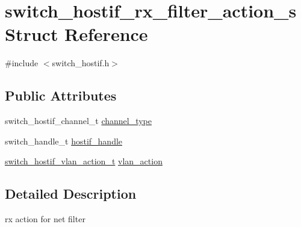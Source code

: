 \hypertarget{structswitch__hostif__rx__filter__action__s}{\section{switch\+\_\+hostif\+\_\+rx\+\_\+filter\+\_\+action\+\_\+s Struct Reference}
\label{structswitch__hostif__rx__filter__action__s}
}


{\ttfamily \#include $<$switch\+\_\+hostif.\+h$>$}

\subsection*{Public Attributes}
\begin{DoxyCompactItemize}
\item 
switch\+\_\+hostif\+\_\+channel\+\_\+t \hyperlink{structswitch__hostif__rx__filter__action__s_a0e411945f11d1b548a79be4045691213}{channel\+\_\+type}
\item 
switch\+\_\+handle\+\_\+t \hyperlink{structswitch__hostif__rx__filter__action__s_a977f68ee2d87da51abba7deb5bfa9fc5}{hostif\+\_\+handle}
\item 
\hyperlink{group__HostInterface_ga941337bc8e6d3df44983db93d6000a15}{switch\+\_\+hostif\+\_\+vlan\+\_\+action\+\_\+t} \hyperlink{structswitch__hostif__rx__filter__action__s_a216bec8f68ff4b9a30ae0f29c86b53c5}{vlan\+\_\+action}
\end{DoxyCompactItemize}


\subsection{Detailed Description}
rx action for net filter 

